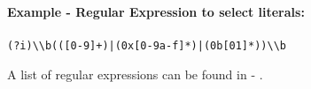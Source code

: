 \paragraph{Example - Regular Expression to select literals:}
\begin{mdframed}[backgroundcolor=light-gray, roundcorner=10pt,leftmargin=1, rightmargin=1, innerleftmargin=15, innertopmargin=6,innerbottommargin=6, outerlinewidth=1, linecolor=light-gray]
\begin{lstlisting}[style=hasm]
(?i)\\b(([0-9]+)|(0x[0-9a-f]*)|(0b[01]*))\\b
\end{lstlisting}
\end{mdframed}
A list of regular expressions can be found in \cite{textmate-regex} - .